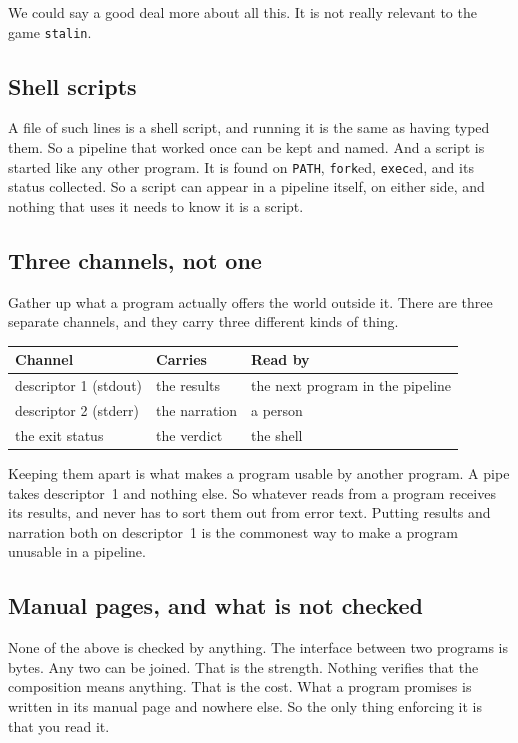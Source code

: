 \documentclass[11pt,a4paper]{article}
\begin{document}
We could say a good deal more about all this. It is not really relevant to the game
\texttt{stalin}.

\subsection{Shell scripts}

A file of such lines is a shell script, and running it is the same as having typed them. So a
pipeline that worked once can be kept and named. And a script is started like any other program. It
is found on \texttt{PATH}, \texttt{fork}ed, \texttt{exec}ed, and its status collected. So a script
can appear in a pipeline itself, on either side, and nothing that uses it needs to know it is a
script.

\subsection{Three channels, not one}

Gather up what a program actually offers the world outside it. There are three separate
channels, and they carry three different kinds of thing.

\begin{center}
\begin{tabular}{lll}
\toprule
\textbf{Channel} & \textbf{Carries} & \textbf{Read by} \\
\midrule
descriptor 1 (stdout) & the results  & the next program in the pipeline \\
descriptor 2 (stderr) & the narration & a person \\
the exit status       & the verdict  & the shell \\
\bottomrule
\end{tabular}
\end{center}

Keeping them apart is what makes a program usable by another program. A pipe takes descriptor~1
and nothing else. So whatever reads from a program receives its results, and never has to sort them
out from error text. Putting results and narration both on descriptor~1 is the commonest way to
make a program unusable in a pipeline.

\subsection{Manual pages, and what is not checked}

None of the above is checked by anything. The interface between two programs is bytes. Any two
can be joined. That is the strength. Nothing verifies that the composition means anything. That is
the cost. What a program promises is written in its manual page and nowhere else. So the only thing
enforcing it is that you read it.
\end{document}
